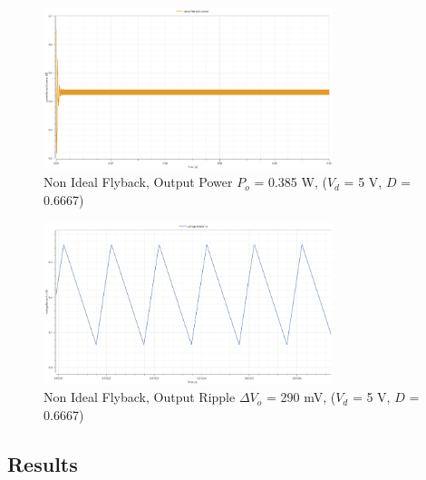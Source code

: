 \documentclass[12pt,twoside]{scrartcl}
\begin{document}
\begin{figure}[htp]
    \centering
    \includegraphics[width=0.75\textwidth]{PowerNonIdealSim12V.png}
    \caption{Non Ideal Flyback, Output Power $P_o$ = 0.385 W, ($V_d$ = 5 V, $D$ = 0.6667)}
    \label{fig:PowerNonIdealSim5V}
\end{figure}

\begin{figure}[htp]
    \centering
    \includegraphics[width=0.75\textwidth]{RippleNonIdealSim5V.png}
    \caption{Non Ideal Flyback, Output Ripple $\Delta V_o$ = 290 mV, ($V_d$ = 5 V, $D$ = 0.6667)}
    \label{fig:RippleNonIdealSim5V}
\end{figure}
\newpage

\subsection{Results}
\end{document}
